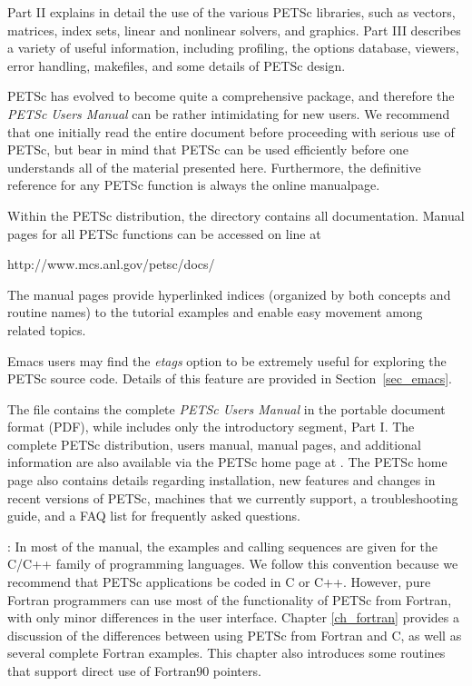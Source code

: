 Part II explains in detail the use of the various PETSc libraries,
such as vectors, matrices, index sets, linear and nonlinear
solvers, and graphics.  Part III describes a variety of useful
information, including profiling, the options database, viewers, error
handling, makefiles, and some details of
PETSc design.

\nocite{efficient}

PETSc has evolved to become quite a comprehensive package, and therefore the
{\em PETSc Users Manual} can be rather intimidating for new users. We
recommend that one initially read the entire document before proceeding with
serious use of PETSc, but bear in mind that PETSc can be used efficiently
before one understands all of the material presented here. Furthermore, the
definitive reference for any PETSc function is always the online manualpage.

\medskip \medskip

Within the PETSc distribution, the directory
 contains all documentation.
Manual pages for all PETSc functions can be
accessed on line at
\begin{tabbing}
  http://www.mcs.anl.gov/petsc/docs/
\end{tabbing}
The manual pages
provide hyperlinked indices (organized by
both concepts and routine names) to the tutorial examples and enable
easy movement among related topics.  

Emacs users may find the
{\em etags} option to be extremely useful for exploring the PETSc
source code.  Details of this feature are provided in
Section~\ref{sec_emacs}. 

The file  contains
the complete {\em PETSc Users Manual} in the portable document format (PDF), 
while  
includes only the introductory segment, Part I.   
The complete PETSc distribution, users
manual, manual pages, and additional information are also available via
the PETSc home page at
.  
The PETSc home page also
contains details regarding installation, new features and changes in recent
versions of PETSc, machines that we currently support, a
troubleshooting guide, and a FAQ list for frequently asked questions.

\medskip\medskip

: In most of the  
manual, the examples and calling sequences are given for the C/C++
family of programming languages.  We follow this convention because we
recommend that PETSc applications be coded in C or C++.
However, pure Fortran programmers can use most of the
functionality of PETSc from Fortran, with only minor differences in
the user interface.  Chapter \ref{ch_fortran} provides a discussion of the
differences between using PETSc from Fortran and C, as well as several
complete Fortran examples.  This chapter also introduces some
routines that support direct use of Fortran90 pointers.

